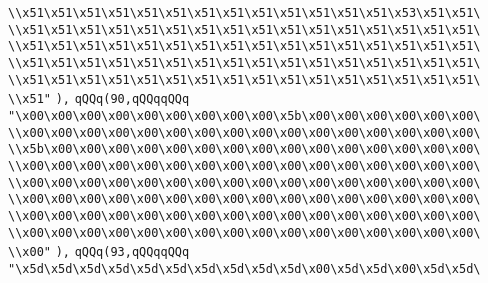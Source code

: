 \verb|\\x51\x51\x51\x51\x51\x51\x51\x51\x51\x51\x51\x51\x51\x53\x51\x51\|\newline
\verb|\\x51\x51\x51\x51\x51\x51\x51\x51\x51\x51\x51\x51\x51\x51\x51\x51\|\newline
\verb|\\x51\x51\x51\x51\x51\x51\x51\x51\x51\x51\x51\x51\x51\x51\x51\x51\|\newline
\verb|\\x51\x51\x51\x51\x51\x51\x51\x51\x51\x51\x51\x51\x51\x51\x51\x51\|\newline
\verb|\\x51\x51\x51\x51\x51\x51\x51\x51\x51\x51\x51\x51\x51\x51\x51\x51\|\newline
\verb|\\x51"|\newline
\verb|),|\newline
\verb|qQQq(90,qQQqqQQq|\newline
\verb|"\x00\x00\x00\x00\x00\x00\x00\x00\x00\x5b\x00\x00\x00\x00\x00\x00\|\newline
\verb|\\x00\x00\x00\x00\x00\x00\x00\x00\x00\x00\x00\x00\x00\x00\x00\x00\|\newline
\verb|\\x5b\x00\x00\x00\x00\x00\x00\x00\x00\x00\x00\x00\x00\x00\x00\x00\|\newline
\verb|\\x00\x00\x00\x00\x00\x00\x00\x00\x00\x00\x00\x00\x00\x00\x00\x00\|\newline
\verb|\\x00\x00\x00\x00\x00\x00\x00\x00\x00\x00\x00\x00\x00\x00\x00\x00\|\newline
\verb|\\x00\x00\x00\x00\x00\x00\x00\x00\x00\x00\x00\x00\x00\x00\x00\x00\|\newline
\verb|\\x00\x00\x00\x00\x00\x00\x00\x00\x00\x00\x00\x00\x00\x00\x00\x00\|\newline
\verb|\\x00\x00\x00\x00\x00\x00\x00\x00\x00\x00\x00\x00\x00\x00\x00\x00\|\newline
\verb|\\x00"|\newline
\verb|),|\newline
\verb|qQQq(93,qQQqqQQq|\newline
\verb|"\x5d\x5d\x5d\x5d\x5d\x5d\x5d\x5d\x5d\x5d\x00\x5d\x5d\x00\x5d\x5d\|\newline
